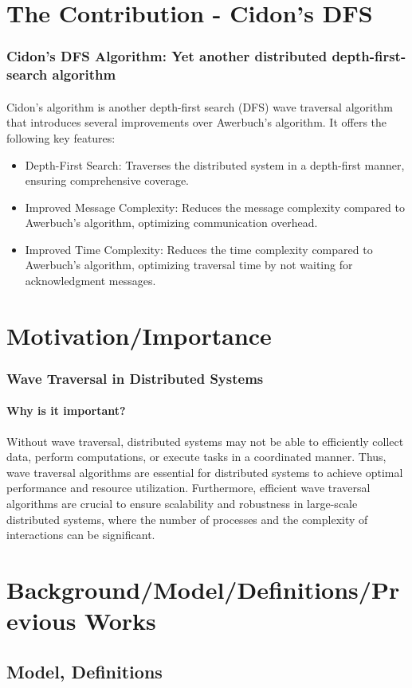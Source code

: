 \documentclass[11pt]{beamer}              %
\begin{document}
\section{The Contribution - Cidon's DFS}
\begin{frame}
\frametitle{Cidon's DFS Algorithm: Yet another distributed depth-first-search algorithm}
\framesubtitle{}
Cidon's algorithm is another depth-first search (DFS) wave traversal algorithm that introduces several improvements over Awerbuch's algorithm. It offers the following key features:
\begin{itemize}
\item Depth-First Search: Traverses the distributed system in a depth-first manner, ensuring comprehensive coverage.
\item Improved Message Complexity: Reduces the message complexity compared to Awerbuch's algorithm, optimizing communication overhead.
\item Improved Time Complexity: Reduces the time complexity compared to Awerbuch's algorithm, optimizing traversal time by not waiting for acknowledgment messages.
\end{itemize}
\end{frame}


\section{Motivation/Importance}
\begin{frame}
\frametitle{Wave Traversal in Distributed Systems}
\framesubtitle{Why is it important?}
Without wave traversal, distributed systems may not be able to efficiently collect data, perform computations, or execute tasks in a coordinated manner. Thus, wave traversal algorithms are essential for distributed systems to achieve optimal performance and resource utilization.
Furthermore, efficient wave traversal algorithms are crucial to ensure scalability and robustness in large-scale distributed systems, where the number of processes and the complexity of interactions can be significant.
\end{frame}

\section{Background/Model/Definitions/Previous Works}


\subsection{Model, Definitions}
\end{document}
